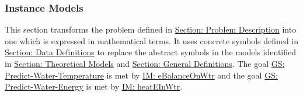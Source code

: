 \documentclass[12pt]{article}
\begin{document}
\subsubsection{Instance Models}
\label{Sec:IMs}
This section transforms the problem defined in \hyperref[Sec:ProbDesc]{Section: Problem Description} into one which is expressed in mathematical terms. It uses concrete symbols defined in \hyperref[Sec:DDs]{Section: Data Definitions} to replace the abstract symbols in the models identified in \hyperref[Sec:TMs]{Section: Theoretical Models} and \hyperref[Sec:GDs]{Section: General Definitions}.
The goal \hyperref[waterTempGS]{GS: Predict-Water-Temperature} is met by \hyperref[IM:eBalanceOnWtr]{IM: eBalanceOnWtr} and the goal \hyperref[waterEnergyGS]{GS: Predict-Water-Energy} is met by \hyperref[IM:heatEInWtr]{IM: heatEInWtr}.
\par~
\end{document}
